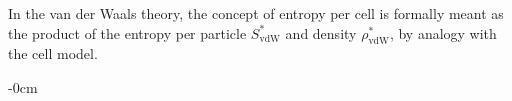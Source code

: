 \documentclass[entropy,article,submit,pdftex,moreauthors]{Definitions/mdpi}
\begin{document}
In the van der Waals theory, the concept of entropy per cell is formally meant as the product of the entropy per particle $S^*_{\mathrm{vdW}}$ and density $\rho^*_{\mathrm{vdW}}$, by analogy with the cell model.




\begin{adjustwidth}{-\extralength}{0cm}








\end{adjustwidth}
\end{document}
